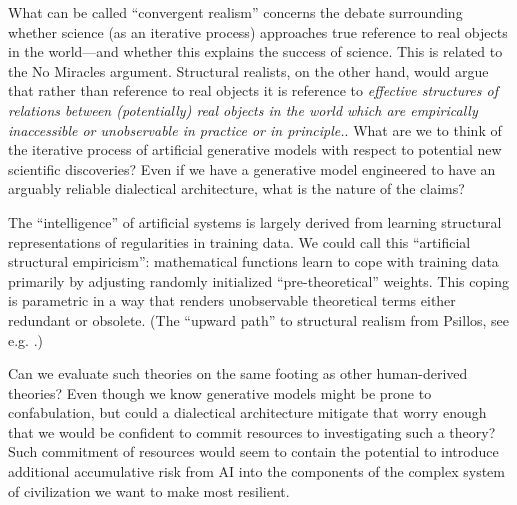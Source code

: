 \documentclass[11pt, oneside]{article}   	%
\begin{document}

What can be called ``convergent realism'' concerns the debate surrounding whether science (as an iterative process) approaches true reference to real objects in the world---and whether this explains the success of science.  This is related to the No Miracles argument.  Structural realists, on the other hand, would argue that rather than reference to real objects it is reference to \emph{effective structures of relations between (potentially) real objects in the world which are empirically inaccessible or unobservable in practice or in principle.}.  What are we to think of the iterative process of artificial generative models with respect to potential new scientific discoveries? Even if we have a generative model engineered to have an arguably reliable dialectical architecture, what is the nature of the claims?  

The ``intelligence'' of artificial systems is largely derived from learning structural representations of regularities in training data. We could call this ``artificial structural empiricism'': mathematical functions learn to cope with training data primarily by adjusting randomly initialized ``pre-theoretical'' weights.  This coping is parametric in a way that renders unobservable theoretical terms either redundant or obsolete.  (The ``upward path'' to structural realism from Psillos, see e.g. \citep[\S 3]{sep-structural-realism}.)

Can we evaluate such theories on the same footing as other human-derived theories?  Even though we know generative models might be prone to confabulation, but could a dialectical architecture mitigate that worry enough that we would be confident to commit resources to investigating such a theory?  Such commitment of resources would seem to contain the potential to introduce additional accumulative risk from AI into the components of the complex system of civilization we want to make most resilient.


\end{document}
